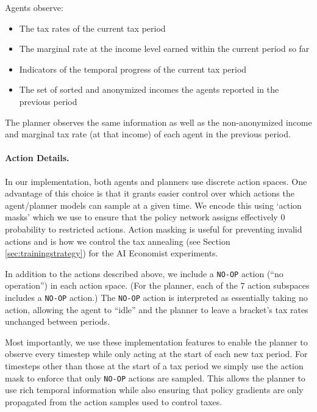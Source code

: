 Agents observe:
\begin{itemize}
    \item The tax rates of the current tax period
    \item The marginal rate at the income level earned within the current period so far
    \item Indicators of the temporal progress of the current tax period
    \item The set of sorted and anonymized incomes the agents reported in the previous period
\end{itemize}
The planner observes the same information as well as the non-anonymized income and marginal tax rate (at that income) of each agent in the previous period.


\paragraph{Action Details.}
In our implementation, both agents and planners use discrete action spaces.
One advantage of this choice is that it grants easier control over which actions the agent/planner models can sample at a given time.
We encode this using `action masks' which we use to ensure that the policy network assigns effectively 0 probability to restricted actions.
Action masking is useful for preventing invalid actions and is how we control the tax annealing (see Section \ref{sec:trainingstrategy}) for the AI Economist experiments.

In addition to the actions described above, we include a \texttt{NO-OP} action (``no operation'') in each action space.
(For the planner, each of the 7 action subspaces includes a \texttt{NO-OP} action.)
The \texttt{NO-OP} action is interpreted as essentially taking no action, allowing the agent to ``idle'' and the planner to leave a bracket's tax rates unchanged between periods.

Most importantly, we use these implementation features to enable the planner to observe every timestep while only acting at the start of each new tax period.
For timesteps other than those at the start of a tax period we simply use the action mask to enforce that only \texttt{NO-OP} actions are sampled.
This allows the planner to use rich temporal information while also ensuring that policy gradients are only propagated from the action samples used to control taxes.









